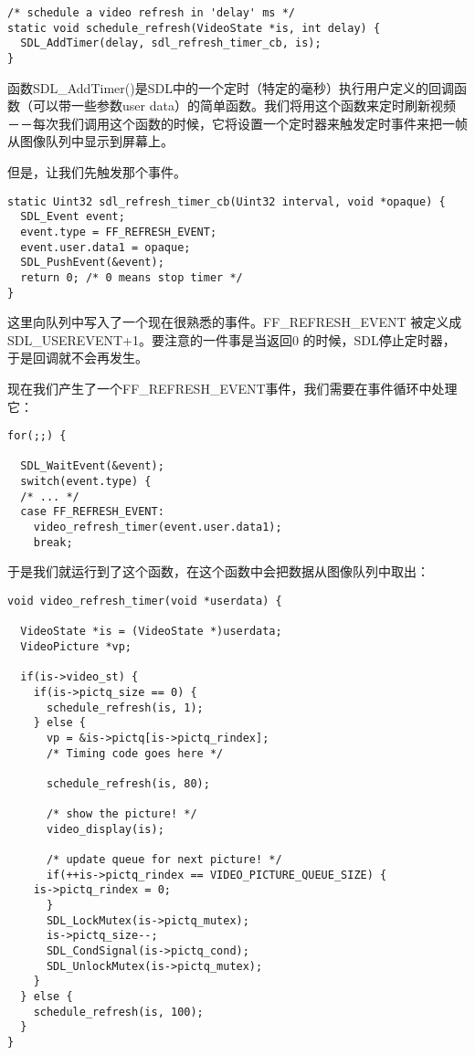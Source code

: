\begin{lstlisting}
/* schedule a video refresh in 'delay' ms */
static void schedule_refresh(VideoState *is, int delay) {
  SDL_AddTimer(delay, sdl_refresh_timer_cb, is);
}
\end{lstlisting}

函数SDL_AddTimer()是SDL中的一个定时（特定的毫秒）执行用户定义的回调函数（可以带一些参数user data）的简单函数。我们将用这个函数来定时刷新视频－－每次我们调用这个函数的时候，它将设置一个定时器来触发定时事件来把一帧从图像队列中显示到屏幕上。

但是，让我们先触发那个事件。
\begin{lstlisting}
static Uint32 sdl_refresh_timer_cb(Uint32 interval, void *opaque) {
  SDL_Event event;
  event.type = FF_REFRESH_EVENT;
  event.user.data1 = opaque;
  SDL_PushEvent(&event);
  return 0; /* 0 means stop timer */
}
\end{lstlisting}

这里向队列中写入了一个现在很熟悉的事件。FF_REFRESH_EVENT 被定义成SDL_USEREVENT+1。要注意的一件事是当返回0 的时候，SDL停止定时器，于是回调就不会再发生。

现在我们产生了一个FF_REFRESH_EVENT事件，我们需要在事件循环中处理它：
\begin{lstlisting}
for(;;) {

  SDL_WaitEvent(&event);
  switch(event.type) {
  /* ... */
  case FF_REFRESH_EVENT:
    video_refresh_timer(event.user.data1);
    break;
\end{lstlisting}

于是我们就运行到了这个函数，在这个函数中会把数据从图像队列中取出：
\begin{lstlisting}
void video_refresh_timer(void *userdata) {

  VideoState *is = (VideoState *)userdata;
  VideoPicture *vp;

  if(is->video_st) {
    if(is->pictq_size == 0) {
      schedule_refresh(is, 1);
    } else {
      vp = &is->pictq[is->pictq_rindex];
      /* Timing code goes here */

      schedule_refresh(is, 80);

      /* show the picture! */
      video_display(is);

      /* update queue for next picture! */
      if(++is->pictq_rindex == VIDEO_PICTURE_QUEUE_SIZE) {
    is->pictq_rindex = 0;
      }
      SDL_LockMutex(is->pictq_mutex);
      is->pictq_size--;
      SDL_CondSignal(is->pictq_cond);
      SDL_UnlockMutex(is->pictq_mutex);
    }
  } else {
    schedule_refresh(is, 100);
  }
}
\end{lstlisting}

